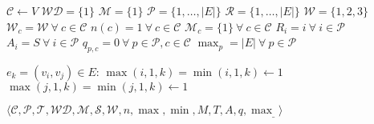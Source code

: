 \begin{codebox}
\li $\mathcal{C} \gets V$
\li $\mathcal{WD} = \{1\}$
\li $\mathcal{M} = \{1\}$
\li $\mathcal{P} = \{1, \dots, |E|\}$
\li $\mathcal{R} = \{1, \dots, |E|\}$
\li $\mathcal{W} = \{1, 2, 3\}$
\li $\mathcal{W}_c = \mathcal{W}\ \forall\ c \in \mathcal{C}$
\li $n(c) = 1\ \forall\ c \in \mathcal{C}$
\li $\mathcal{M}_c = \{1\}\ \forall\ c \in \mathcal{C}$
\li $R_i = i\ \forall\ i \in \mathcal{P}$
\li $A_i = S\ \forall\ i \in \mathcal{P}$
\li $q_{p, c} = 0\ \forall\ p \in \mathcal{P}, c \in \mathcal{C}$
\li $\max_p = |E|\ \forall\ p \in \mathcal{P}$

\li \For $e_k = (v_i, v_j) \in E$:
\li \Do $\max(i, 1, k) = \min(i, 1, k) \gets 1$
\li     $\max(j, 1, k) = \min(j, 1, k) \gets 1$
    \End

    \li \Return $\langle \mathcal{C}, \mathcal{P}, \mathcal{T}, \mathcal{WD}, \mathcal{M}, \mathcal{S}, \mathcal{W}, n, \max, \min, M, T, A, q, \max_{\_} \rangle$
\end{codebox}
